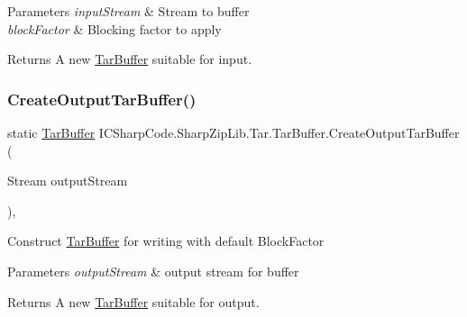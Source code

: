 \begin{DoxyParams}{Parameters}
{\em input\+Stream} & Stream to buffer\\
\hline
{\em block\+Factor} & Blocking factor to apply\\
\hline
\end{DoxyParams}
\begin{DoxyReturn}{Returns}
A new \hyperlink{class_i_c_sharp_code_1_1_sharp_zip_lib_1_1_tar_1_1_tar_buffer}{Tar\+Buffer} suitable for input.
\end{DoxyReturn}
\mbox{\label{class_i_c_sharp_code_1_1_sharp_zip_lib_1_1_tar_1_1_tar_buffer_a4c89266b04551c24a3ba0d44be404395}} 
\subsubsection{\texorpdfstring{Create\+Output\+Tar\+Buffer()}{CreateOutputTarBuffer()}\hspace{0.1cm}{\footnotesize\ttfamily [1/2]}}
{\footnotesize\ttfamily static \hyperlink{class_i_c_sharp_code_1_1_sharp_zip_lib_1_1_tar_1_1_tar_buffer}{Tar\+Buffer} I\+C\+Sharp\+Code.\+Sharp\+Zip\+Lib.\+Tar.\+Tar\+Buffer.\+Create\+Output\+Tar\+Buffer (\begin{DoxyParamCaption}\item[{Stream}]{output\+Stream }\end{DoxyParamCaption})\hspace{0.3cm}{\ttfamily [inline]}, {\ttfamily [static]}}



Construct \hyperlink{class_i_c_sharp_code_1_1_sharp_zip_lib_1_1_tar_1_1_tar_buffer}{Tar\+Buffer} for writing with default Block\+Factor 


\begin{DoxyParams}{Parameters}
{\em output\+Stream} & output stream for buffer\\
\hline
\end{DoxyParams}
\begin{DoxyReturn}{Returns}
A new \hyperlink{class_i_c_sharp_code_1_1_sharp_zip_lib_1_1_tar_1_1_tar_buffer}{Tar\+Buffer} suitable for output.
\end{DoxyReturn}
\mbox{\label{class_i_c_sharp_code_1_1_sharp_zip_lib_1_1_tar_1_1_tar_buffer_a014b9836e186c6bc0a4b00b486ddd047}} 
